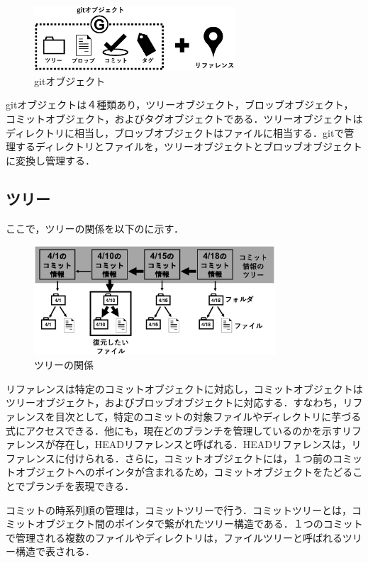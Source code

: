 \documentclass[a4j,9pt,twocolumn]{jsarticle}
\begin{document}
\begin{figure}[h]
\centering
\includegraphics[width=75mm]{img/git_obj2.eps}
\caption{gitオブジェクト}
\label{object2}
\end{figure}

gitオブジェクトは４種類あり，ツリーオブジェクト，ブロッブオブジェクト，コミットオブジェクト，およびタグオブジェクトである．ツリーオブジェクトはディレクトリに相当し，ブロッブオブジェクトはファイルに相当する．gitで管理するディレクトリとファイルを，ツリーオブジェクトとブロッブオブジェクトに変換し管理する．

\subsection{ツリー}
ここで，ツリーの関係を以下のに示す．

\begin{figure}[h]
\centering
\includegraphics[width=90mm]{img/tree.eps}
\caption{ツリーの関係}
\label{tree}
\end{figure}

リファレンスは特定のコミットオブジェクトに対応し，コミットオブジェクトはツリーオブジェクト，およびブロッブオブジェクトに対応する．すなわち，リファレンスを目次として，特定のコミットの対象ファイルやディレクトリに芋づる式にアクセスできる．他にも，現在どのブランチを管理しているのかを示すリファレンスが存在し，HEADリファレンスと呼ばれる．HEADリファレンスは，リファレンスに付けられる．さらに，コミットオブジェクトには，１つ前のコミットオブジェクトへのポインタが含まれるため，コミットオブジェクトをたどることでブランチを表現できる．

コミットの時系列順の管理は，コミットツリーで行う．コミットツリーとは，コミットオブジェクト間のポインタで繋がれたツリー構造である．１つのコミットで管理される複数のファイルやディレクトリは，ファイルツリーと呼ばれるツリー構造で表される．
\end{document}
